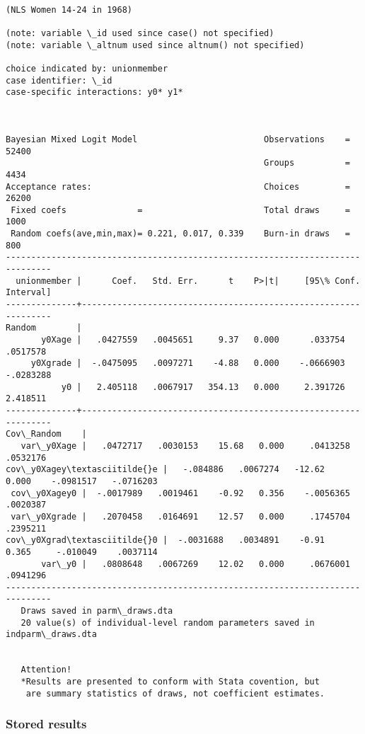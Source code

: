 \documentclass[11pt]{article}
\begin{document}
    \begin{Verbatim}[commandchars=\\\{\}]

(NLS Women 14-24 in 1968)

(note: variable \_id used since case() not specified)
(note: variable \_altnum used since altnum() not specified)

choice indicated by: unionmember
case identifier: \_id
case-specific interactions: y0* y1*



Bayesian Mixed Logit Model                         Observations    =     52400
                                                   Groups          =      4434
Acceptance rates:                                  Choices         =     26200
 Fixed coefs              =                        Total draws     =      1000
 Random coefs(ave,min,max)= 0.221, 0.017, 0.339    Burn-in draws   =       800
-------------------------------------------------------------------------------
  unionmember |      Coef.   Std. Err.      t    P>|t|     [95\% Conf. Interval]
--------------+----------------------------------------------------------------
Random        |
       y0Xage |   .0427559   .0045651     9.37   0.000      .033754    .0517578
     y0Xgrade |  -.0475095   .0097271    -4.88   0.000    -.0666903   -.0283288
           y0 |   2.405118   .0067917   354.13   0.000     2.391726    2.418511
--------------+----------------------------------------------------------------
Cov\_Random    |
   var\_y0Xage |   .0472717   .0030153    15.68   0.000     .0413258    .0532176
cov\_y0Xagey\textasciitilde{}e |   -.084886   .0067274   -12.62   0.000    -.0981517   -.0716203
 cov\_y0Xagey0 |  -.0017989   .0019461    -0.92   0.356    -.0056365    .0020387
 var\_y0Xgrade |   .2070458   .0164691    12.57   0.000     .1745704    .2395211
cov\_y0Xgrad\textasciitilde{}0 |  -.0031688   .0034891    -0.91   0.365     -.010049    .0037114
       var\_y0 |   .0808648   .0067269    12.02   0.000     .0676001    .0941296
-------------------------------------------------------------------------------
   Draws saved in parm\_draws.dta
   20 value(s) of individual-level random parameters saved in indparm\_draws.dta


   Attention!
   *Results are presented to conform with Stata covention, but
    are summary statistics of draws, not coefficient estimates.
    \end{Verbatim}

    \hypertarget{stored-results}{%
\subsubsection{Stored results}\label{stored-results}}
\end{document}
